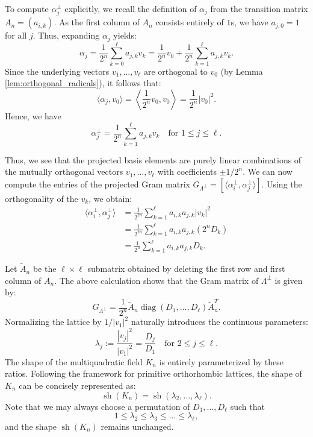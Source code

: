 \documentclass{amsart}
\theoremstyle{plain}
\theoremstyle{definition}
\theoremstyle{remark}
\numberwithin{equation}{section}
\begin{document}
To compute $\alpha_j^\perp$ explicitly, we recall the definition of $\alpha_j$ from the transition matrix $A_n = (a_{i,k})$. As the first column of $A_n$ consists entirely of $1$s, we have $a_{j,0} = 1$ for all $j$. Thus, expanding $\alpha_j$ yields:
\[
    \alpha_j = \frac{1}{2^n} \sum_{k=0}^{\ell} a_{j,k} v_k = \frac{1}{2^n} v_0 + \frac{1}{2^n} \sum_{k=1}^{\ell} a_{j,k} v_k.
\]
Since the underlying vectors $v_1, \ldots, v_{\ell}$ are orthogonal to $v_0$ (by Lemma \ref{lem:orthogonal_radicals}), it follows that:
\[
    \langle \alpha_j, v_0 \rangle = \left\langle \frac{1}{2^n} v_0, v_0 \right\rangle = \frac{1}{2^n} |v_0|^2.
\]
Hence, we have
\[
    \alpha_j^\perp = \frac{1}{2^n} \sum_{k=1}^{\ell} a_{j,k} v_k \quad \text{for } 1 \leq j \leq \ell.
\]

Thus, we see that the projected basis elements are purely linear combinations of the mutually orthogonal vectors $v_1, \ldots, v_{\ell}$ with coefficients $\pm 1/2^n$. We can now  compute the entries of the projected Gram matrix $G_{\Lambda^\perp} = [\langle \alpha_i^\perp, \alpha_j^\perp \rangle]$. Using the orthogonality of the $v_k$, we obtain:
\begin{align*}
    \langle \alpha_i^\perp, \alpha_j^\perp \rangle &= \frac{1}{2^{2n}} \sum_{k=1}^{\ell} a_{i,k} a_{j,k} |v_k|^2 \\
    &= \frac{1}{2^{2n}} \sum_{k=1}^{\ell} a_{i,k} a_{j,k} (2^n D_k) \\
    &= \frac{1}{2^n} \sum_{k=1}^{\ell} a_{i,k} a_{j,k} D_k.
\end{align*}

Let $\tilde{A}_n$ be the $\ell \times \ell$ submatrix obtained by deleting the first row and first column of $A_n$. The above calculation shows that the Gram matrix of $\Lambda^\perp$ is given by:
\[
    G_{\Lambda^\perp} = \frac{1}{2^n} \tilde{A}_n \operatorname{diag}(D_1, \ldots, D_{\ell}) \tilde{A}_n^T.
\]
Normalizing the lattice by $1/|v_1|^2$ naturally introduces the continuous parameters:
\[
    \lambda_j := \frac{|v_j|^2}{|v_1|^2} = \frac{D_j}{D_1} \quad \text{for } 2 \leq j \leq \ell.
\]
The shape of the multiquadratic field $K_n$ is entirely parameterized by these ratios. Following the framework for primitive orthorhombic lattices, the shape of $K_n$ can be concisely represented as:
\[
    \operatorname{sh}(K_n) = \operatorname{sh}(\lambda_2, \ldots, \lambda_{\ell}).
\]
Note that we may always choose a permutation of $D_1, \dots, D_\ell$ such that 
\[1\leq \lambda_{2}\leq \lambda_3\leq  \ldots \leq \lambda_{\ell},\] and the shape $\operatorname{sh}(K_n)$ remains unchanged.
\end{document}
